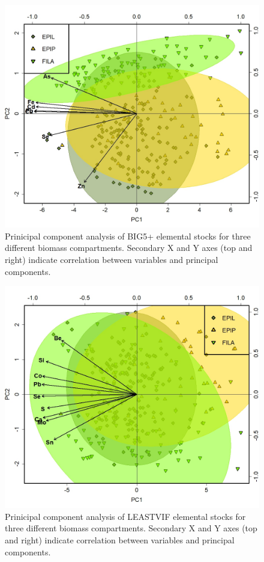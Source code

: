 \documentclass[
]{article}
\begin{document}
\begin{figure}
\includegraphics[width=1\linewidth]{Figures/PCA_2_BIG5PLUS} \caption[Prinicipal component analysis of BIG5+ elemental stocks for three different biomass compartments]{Prinicipal component analysis of BIG5+ elemental stocks for three different biomass compartments. Secondary X and Y axes (top and right) indicate correlation between variables and principal components.}\label{fig:unnamed-chunk-13}
\end{figure}

\FloatBarrier

\begin{figure}
\includegraphics[width=1\linewidth]{Figures/PCA_2_LEASTVIF} \caption[Prinicipal component analysis of LEASTVIF elemental stocks for three different biomass compartments]{Prinicipal component analysis of LEASTVIF elemental stocks for three different biomass compartments. Secondary X and Y axes (top and right) indicate correlation between variables and principal components.}\label{fig:unnamed-chunk-14}
\end{figure}
\end{document}
